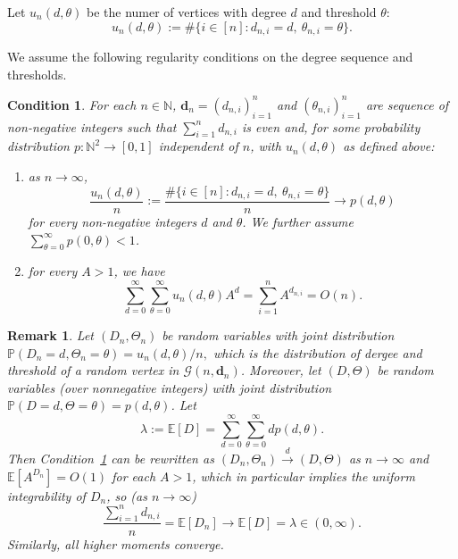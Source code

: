 \documentclass[11pt]{article}
\newtheorem{remark}[theorem]{Remark}
\newtheorem{condition}[theorem]{Condition}
\def\EE{\mathbb{E}}
\def\PP{\mathbb{P}}
\def\NN{\mathbb{N}}
\def\tod{\stackrel{d}{\longrightarrow}}
\newcommand{\cG}{\mathcal{G}}
\newcommand\bd{\mathbf{d}}
\def\tod{\stackrel{d}{\longrightarrow}}
\begin{document}
Let $u_n(d, \theta)$ be the numer of vertices with degree $d$ and threshold $\theta$:
\begin{equation*}
u_n(d, \theta) := \#\{ i \in [n]:  d_{n,i} = d, \ \theta_{n,i} = \theta \}.
\end{equation*}

We assume the following regularity conditions on the degree sequence and thresholds. 


\begin{condition}\label{cond}
For each $n\in \NN$, $\bd_n = (d_{n,i})_{i=1}^n$ and $(\theta_{n,i})_{i=1}^n$ are sequence of non-negative integers such that
$\sum_{i=1}^n d_{n,i}$ is even and, for some probability distribution $p:\NN^2\to [0,1]$ independent of $n$, with $u_n(d, \theta)$ as defined above:
\begin{enumerate}
    \item[$(C_1)$] as $n\to \infty$, 
    \begin{equation*}
    \frac{u_n(d,\theta)}{n}:=\frac{\#\{ i \in [n]:  d_{n,i} = d, \ \theta_{n,i} = \theta \}}{n} \longrightarrow p(d,\theta)
    \end{equation*}
for every non-negative integers $d$ and $\theta$. We further assume $\sum_{\theta=0}^\infty p(0,\theta)<1$.
\item[$(C_2)$] for every $A>1$, we have
\begin{equation*}%
    \sum_{d= 0}^\infty \sum_{\theta=0}^\infty u_n(d,\theta)A^d = \sum_{i=1}^n A^{d_{n,i}} = O(n).
\end{equation*}
\end{enumerate}
\end{condition}


\begin{remark}
Let $(D_n,\Theta_n)$ be random variables with joint distribution $\PP(D_n=d, \Theta_n=\theta)=u_n(d, \theta)/n,$
which is the distribution of dergee and threshold of a random vertex in $\cG(n,\bd_n)$. Moreover, let $(D,\Theta)$ be random variables (over nonnegative integers) with joint distribution $\PP(D=d, \Theta=\theta)=p(d,\theta)$. Let 
\begin{equation*}
\lambda:=\EE[D]= \sum_{d= 0}^\infty \sum_{\theta=0}^\infty dp(d,\theta).
\end{equation*}
Then Condition~\ref{cond} can be rewritten as $(D_n, \Theta_n) \tod (D, \Theta)$ as $n\to \infty$ and $\EE[A^{D_n}]=O(1)$ for each $A>1$, which in particular implies the uniform integrability of $D_n$, so (as $n\to \infty$) 
\begin{equation*}
\frac{\sum_{i=1}^n d_{n,i}}{n} = \EE[D_n] \longrightarrow \EE[D]=\lambda \in (0,\infty).
\end{equation*}
Similarly, all higher moments converge.
\end{remark}
\end{document}
